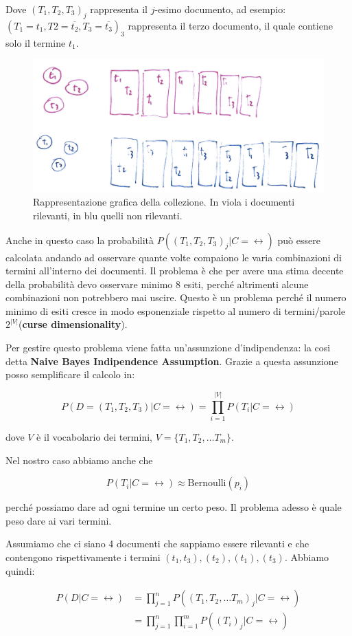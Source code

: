 Dove $(T_1, T_2,T_3)_j$ rappresenta il $j$-esimo documento, ad esempio: $(T_1 = t_1, T2 = \overline{t_2},T_3 = \overline{t_3})_3$ rappresenta il terzo documento, il quale contiene solo il termine $t_1$.

\begin{figure}[htbp]
	\centering
	\includegraphics[width=.5\textwidth]{images/l10-fig-2}
	\caption{Rappresentazione grafica della collezione. In viola i documenti rilevanti, in blu quelli non rilevanti.}
\end{figure}

Anche in questo caso la probabilità $P((T_1, T_2,T_3)_j | C = \rel)$ può essere calcolata andando ad osservare quante volte compaiono le varia combinazioni di termini all'interno dei documenti.
Il problema è che per avere una stima decente della probabilità devo osservare minimo 8 esiti, perché altrimenti alcune combinazioni non potrebbero mai uscire.
Questo è un problema perché il numero minimo di esiti cresce in modo esponenziale rispetto al numero di termini/parole $2^{|V|}$(\textbf{curse dimensionality}).

Per gestire questo problema viene fatta un'assunzione d'indipendenza: la cosi detta \textbf{Naive Bayes Indipendence Assumption}.
Grazie a questa assunzione posso semplificare il calcolo in:

$$
P(D=(T_1, T_2, T_3) | C = \rel) = \prod\limits_{i = 1}^{|V|}P(T_i|C=\rel)
$$

\noindent dove $V$ è il vocabolario dei termini, $V = \{ T_1, T_2, \ldots T_m\}$.

Nel nostro caso abbiamo anche che

$$
P(T_i|C=\rel) \approx \text{Bernoulli}(p_i)
$$

\noindent perché possiamo dare ad ogni termine un certo peso.
Il problema adesso è quale peso dare ai vari termini.

Assumiamo che ci siano 4 documenti che sappiamo essere rilevanti e che contengono rispettivamente i termini $(t_1, t_3), (t_2), (t_1), (t_3)$. Abbiamo quindi:

\begin{align*}
P(D | C=\rel) &= \prod\limits_{j=1}^n P((T_{1},T_{2},\ldots T_{m})_j|C=\rel) \\
&= \prod\limits_{j=1}^n \prod\limits_{i=1}^m P((T_i)_j | C=\rel)
\end{align*}


